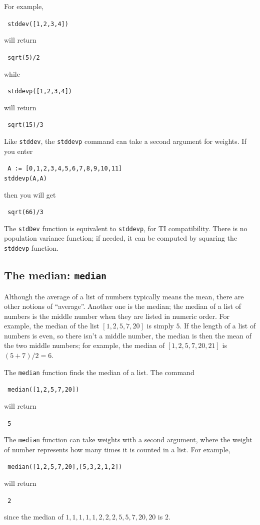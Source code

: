 \documentclass[a4paper,11pt]{book}
\begin{document}
For example,
\begin{center}
  \tt
  stddev([1,2,3,4])
\end{center}
will return
\begin{center}
  \tt
  sqrt(5)/2
\end{center}
while 
\begin{center}
  \tt
  stddevp([1,2,3,4])
\end{center}
will return
\begin{center}
  \tt
  sqrt(15)/3
\end{center}

Like \texttt{stddev}, the \texttt{stddevp} command can take a second
argument for weights.  If you enter
\begin{center}
  \tt
  A := [0,1,2,3,4,5,6,7,8,9,10,11]\\
  stddevp(A,A)
\end{center}
then you will get
\begin{center}
  \tt
  sqrt(66)/3
\end{center}

The \texttt{stdDev} function is equivalent to \texttt{stddevp}, for TI
compatibility.  There is no population variance function; if needed,
it can be computed by squaring the \texttt{stddevp} function.

\subsection{The median: \texttt{median}}

Although the average of a list of numbers typically means the mean,
there are other notions of ``average''.  Another one is the median;
the median of a list of numbers is the middle number when they are
listed in numeric order.  For example, the median of the list
$[1,2,5,7,20]$ is simply $5$.  If the length of a list of numbers is
even, so there isn't a middle number, the median is then the mean of
the two middle numbers; for example, the median of $[1,2,5,7,20,21]$ is 
$(5+7)/2 = 6$.

The \texttt{median} function finds the median of a list.  The command
\begin{center}
  \tt
  median([1,2,5,7,20])
\end{center}
will return
\begin{center}
  \tt
  5
\end{center}
The \texttt{median} function can take weights with a second argument,
where the weight of number represents how many times it is counted in
a list.  For example,
\begin{center}
  \tt
  median([1,2,5,7,20],[5,3,2,1,2])
\end{center}
will return
\begin{center}
  \tt
  2
\end{center}
since the median of $1,1,1,1,1,2,2,2,5,5,7,20,20$ is $2$.
\end{document}
